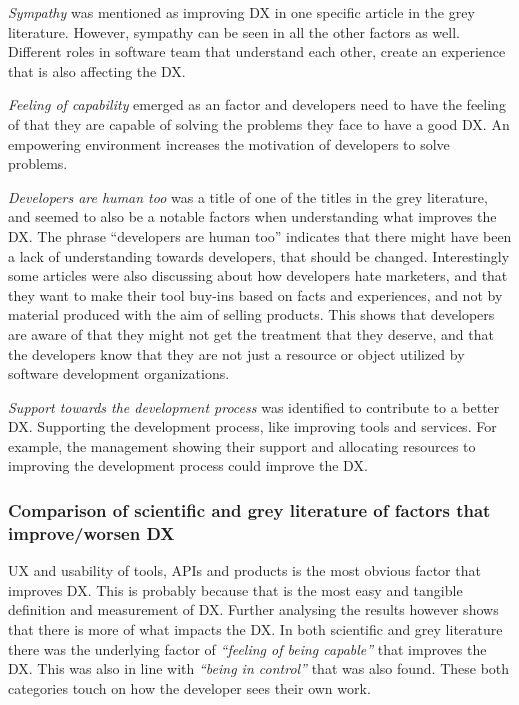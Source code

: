 \documentclass[english, 12pt, a4paper, sci, utf8, a-1b, online]{aaltothesis}
\begin{document}
\textit{Sympathy} was mentioned as improving DX in one specific article in the grey literature. However, sympathy can be seen in all the other factors as well. Different roles in software team that understand each other, create an experience that is also affecting the DX.

\textit{Feeling of capability} emerged as an factor and developers need to have the feeling of that they are capable of solving the problems they face to have a good DX. An empowering environment increases the motivation of developers to solve problems.

\textit{Developers are human too} was a title of one of the titles in the grey literature, and seemed to also be a notable factors when understanding what improves the DX. The phrase ``developers are human too'' indicates that there might have been a lack of understanding towards developers, that should be changed. Interestingly some articles were also discussing about how developers hate marketers, and that they want to make their tool buy-ins based on facts and experiences, and not by material produced with the aim of selling products. This shows that developers are aware of that they might not get the treatment that they deserve, and that the developers know that they are not just a resource or object utilized by software development organizations.

\textit{Support towards the development process} was identified to contribute to a better DX. Supporting the development process, like improving tools and services. For example, the management showing their support and allocating resources to improving the development process could improve the DX.

\subsubsection{Comparison of scientific and grey literature of factors that improve/worsen DX}

UX and usability of tools, APIs and products is the most obvious factor that improves DX. This is probably because that is the most easy and tangible definition and measurement of DX. Further analysing the results however shows that there is more of what impacts the DX. In both scientific and grey literature there was the underlying factor of \textit{``feeling of being capable''} that improves the DX. This was also in line with \textit{``being in control''} that was also found. These both categories touch on how the developer sees their own work.
\end{document}

